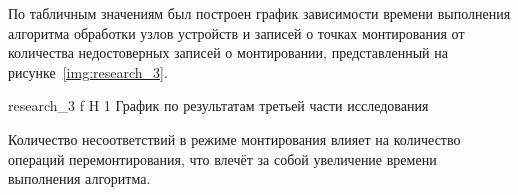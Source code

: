По табличным значениям был построен график зависимости времени выполнения алгоритма обработки узлов устройств и 
записей о точках монтирования от количества недостоверных записей о монтировании, представленный на рисунке~\ref{img:research_3}.

    {research_3}
    {f}
    {H}
    {1\textwidth}
    {График по результатам третьей части исследования}

Количество несоответствий в режиме монтирования влияет на количество операций перемонтирования, что влечёт за собой увеличение
времени выполнения алгоритма.